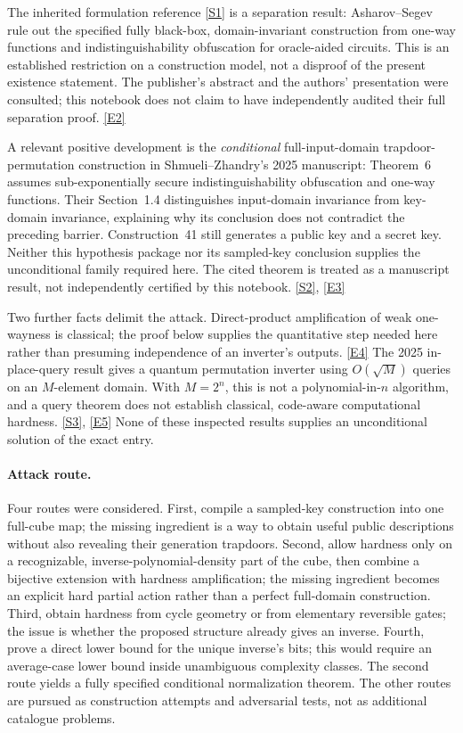 \documentclass[11pt,a4paper]{article}
\newcommand{\sref}[2]{\hyperlink{source:#1:#2}{[S#2]}}
\newcommand{\eref}[2]{\hyperlink{extra:#1:#2}{[E#2]}}
\numberwithin{equation}{section}
\begin{document}
The inherited formulation reference \sref{statement}{1} is a separation result:
Asharov--Segev rule out the specified fully black-box, domain-invariant
construction from one-way functions and indistinguishability obfuscation
for oracle-aided circuits. This is an established restriction on a
construction model, not a disproof of the present existence statement.
The publisher's abstract and the authors' presentation were consulted;
this notebook does not claim to have independently audited their full
separation proof. \eref{statement}{2}

A relevant positive development is the \emph{conditional} full-input-domain
trapdoor-permutation construction in Shmueli--Zhandry's 2025 manuscript:
Theorem~6 assumes sub-exponentially secure indistinguishability obfuscation
and one-way functions. Their Section~1.4 distinguishes input-domain
invariance from key-domain invariance, explaining why its conclusion does
not contradict the preceding barrier. Construction~41 still generates a
public key and a secret key. Neither this hypothesis package nor its
sampled-key conclusion supplies the unconditional family required here.
The cited theorem is treated as a manuscript result, not independently
certified by this notebook. \sref{statement}{2}, \eref{statement}{3}

Two further facts delimit the attack. Direct-product amplification of weak
one-wayness is classical; the proof below supplies the quantitative step
needed here rather than presuming independence of an inverter's outputs.
\eref{statement}{4} The 2025 in-place-query result gives a quantum permutation
inverter using $O(\sqrt{M})$ queries on an $M$-element domain. With
$M=2^n$, this is not a polynomial-in-$n$ algorithm, and a query theorem does
not establish classical, code-aware computational hardness.
\sref{statement}{3}, \eref{statement}{5} None of these inspected results supplies an
unconditional solution of the exact entry.

\paragraph{Attack route.}
Four routes were considered. First, compile a sampled-key construction
into one full-cube map; the missing ingredient is a way to obtain useful
public descriptions without also revealing their generation trapdoors.
Second, allow hardness only on a recognizable, inverse-polynomial-density
part of the cube, then combine a bijective extension with hardness
amplification; the missing ingredient becomes an explicit hard partial
action rather than a perfect full-domain construction. Third, obtain
hardness from cycle geometry or from elementary reversible gates; the
issue is whether the proposed structure already gives an inverse.
Fourth, prove a direct lower bound for the unique inverse's bits; this
would require an average-case lower bound inside unambiguous complexity
classes. The second route yields a fully specified conditional
normalization theorem. The other routes are pursued as construction
attempts and adversarial tests, not as additional catalogue problems.
\end{document}
